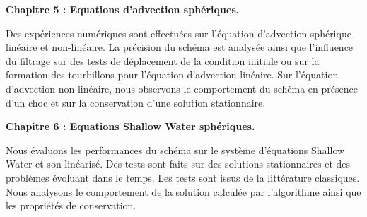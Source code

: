 \vspace{0.7cm}
\textbf{Chapitre 5 : Equations d'advection sphériques.}

Des expériences numériques sont effectuées sur l'équation d'advection sphérique linéaire et non-linéaire. La précision du schéma est analysée ainsi que l'influence du filtrage sur des tests de déplacement de la condition initiale ou sur la formation des tourbillons pour l'équation d'advection linéaire. Sur l'équation d'advection non linéaire, nous observons le comportement du schéma en présence d'un choc et sur la conservation d'une solution stationnaire.  







\vspace{0.7cm}
\textbf{Chapitre 6 : Equations Shallow Water sphériques.}

Nous évaluons les performances du schéma sur le système d'équations Shallow Water et son linéarisé. Des tests sont faits sur des solutions stationnaires et des problèmes évoluant dans le temps. Les tests sont issus de la littérature classiques. Nous analysons le comportement de la solution calculée par l'algorithme ainsi que les propriétés de conservation.

